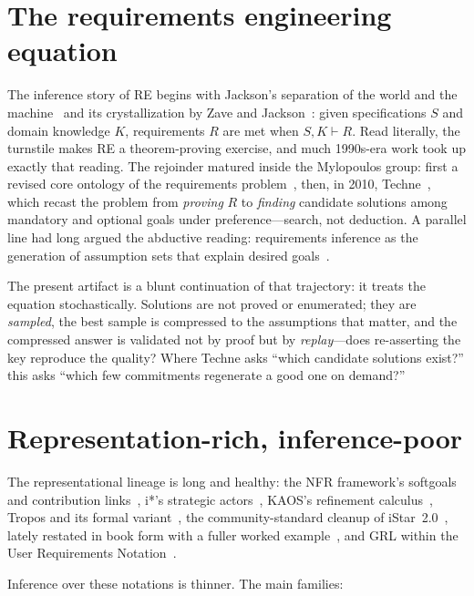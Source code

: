 \documentclass[sigconf,nonacm]{acmart}
\begin{document}
\section{The requirements engineering equation}

The inference story of RE begins with Jackson's separation of
the world and the machine~\cite{jackson95} and its
crystallization by Zave and Jackson~\cite{zave97}: given
specifications $S$ and domain knowledge $K$, requirements $R$
are met when $S,K \vdash R$. Read literally, the turnstile
makes RE a theorem-proving exercise, and much 1990s-era work
took up exactly that reading. The rejoinder matured inside the
Mylopoulos group: first a revised core ontology of the
requirements problem~\cite{jureta08}, then, in 2010, Techne~\cite{jureta10},
which recast the problem from \emph{proving} $R$ to
\emph{finding} candidate solutions among mandatory and optional
goals under preference---search, not deduction. A parallel
line had long argued the abductive reading: requirements
inference as the generation of assumption sets that explain
desired goals~\cite{menzies96}.

The present artifact is a blunt continuation of that
trajectory: it treats the equation stochastically. Solutions
are not proved or enumerated; they are \emph{sampled}, the best
sample is compressed to the assumptions that matter, and the
compressed answer is validated not by proof but by
\emph{replay}---does re-asserting the key reproduce the
quality? Where Techne asks ``which candidate solutions exist?''
this asks ``which few commitments regenerate a good one on
demand?''

\section{Representation-rich, inference-poor}

The representational lineage is long and healthy: the NFR
framework's softgoals and contribution links~\cite{chung00},
i*'s strategic actors~\cite{yu97}, KAOS's
refinement calculus~\cite{vanlam01}, Tropos and its formal
variant~\cite{fuxman04}, the community-standard cleanup of
iStar~2.0~\cite{dalpiaz16}, lately restated in book form with
a fuller worked example~\cite{dalpiaz24}, and GRL within the
User Requirements Notation~\cite{amyot10}.

Inference over these notations is thinner. The main families:
\end{document}
